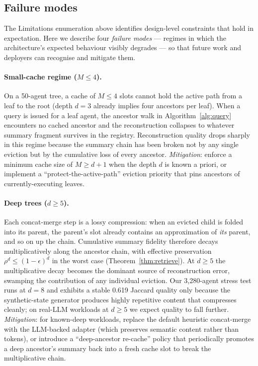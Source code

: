 \documentclass[fleqn,10pt]{article}
\theoremstyle{definition}
\newcommand{\preserv}{\rho}
\newcommand{\slots}{M}
\begin{document}
\subsection*{Failure modes}

The Limitations enumeration above identifies design-level
constraints that hold in expectation. Here we describe four
\emph{failure modes} --- regimes in which the architecture's
expected behaviour visibly degrades --- so that future work and
deployers can recognise and mitigate them.

\paragraph{Small-cache regime ($\slots \leq 4$).}
On a 50-agent tree, a cache of $\slots \leq 4$ slots cannot hold
the active path from a leaf to the root (depth $d{=}3$ already
implies four ancestors per leaf). When a query is issued for a
leaf agent, the ancestor walk in
Algorithm~\ref{alg:query} encounters no cached ancestor and the
reconstruction collapses to whatever summary fragment survives in
the registry. Reconstruction quality drops sharply in this regime
because the summary chain has been broken not by any single eviction
but by the cumulative loss of every ancestor.
\emph{Mitigation}: enforce a minimum cache size of $\slots \geq d+1$
when the depth $d$ is known a priori, or implement a
``protect-the-active-path'' eviction priority that pins ancestors
of currently-executing leaves.

\paragraph{Deep trees ($d \geq 5$).}
Each concat-merge step is a lossy compression: when an evicted
child is folded into its parent, the parent's slot already contains
an approximation of \emph{its} parent, and so on up the chain.
Cumulative summary fidelity therefore decays multiplicatively along
the ancestor chain, with effective preservation
$\preserv^d \leq (1-\epsilon)^d$ in the worst case
(Theorem~\ref{thm:retrieve}). At $d \geq 5$ the multiplicative
decay becomes the dominant source of reconstruction error,
swamping the contribution of any individual eviction. Our
3,280-agent stress test runs at $d{=}8$ and exhibits a stable
0.619 Jaccard quality only because the synthetic-state generator
produces highly repetitive content that compresses cleanly; on
real-LLM workloads at $d \geq 5$ we expect quality to fall further.
\emph{Mitigation}: for known-deep workloads, replace the default
heuristic concat-merge with the LLM-backed adapter (which preserves
semantic content rather than tokens), or introduce a
``deep-ancestor re-cache'' policy that periodically promotes a
deep ancestor's summary back into a fresh cache slot to break the
multiplicative chain.
\end{document}
